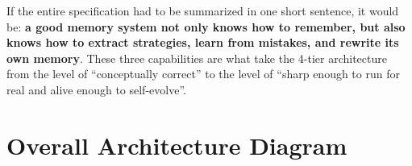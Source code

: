 \documentclass[a4paper,12pt]{article}
\begin{document}
If the entire specification had to be summarized in one short sentence, it would be: \textbf{a good memory system not only knows how to remember, but also knows how to extract strategies, learn from mistakes, and rewrite its own memory}. These three capabilities are what take the 4-tier architecture from the level of ``conceptually correct'' to the level of ``sharp enough to run for real and alive enough to self-evolve''.


\appendix
\newpage

\section{Overall Architecture Diagram}
\end{document}
